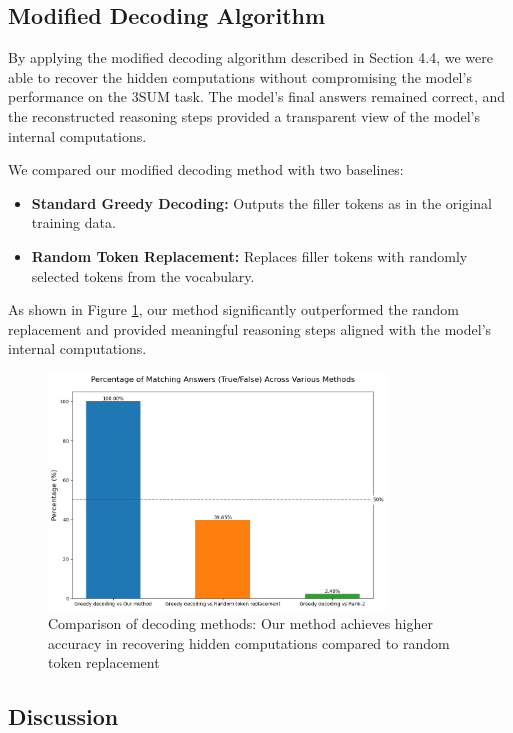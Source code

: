 \documentclass{article}
\begin{document}
\subsection{Modified Decoding Algorithm}

By applying the modified decoding algorithm described in Section 4.4, we were able to recover the hidden computations without compromising the model's performance on the 3SUM task. The model's final answers remained correct, and the reconstructed reasoning steps provided a transparent view of the model's internal computations.

We compared our modified decoding method with two baselines:

\begin{itemize}
    \item \textbf{Standard Greedy Decoding:} Outputs the filler tokens as in the original training data.
    \item \textbf{Random Token Replacement:} Replaces filler tokens with randomly selected tokens from the vocabulary.
\end{itemize}

As shown in Figure \ref{fig:token_comparison}, our method significantly outperformed the random replacement and provided meaningful reasoning steps aligned with the model's internal computations.

\begin{figure}[H]
\centering
\includegraphics[width=0.8\textwidth]{token_comparison_percentages.png}
\caption{Comparison of decoding methods: Our method achieves higher accuracy in recovering hidden computations compared to random token replacement}
\label{fig:token_comparison}
\end{figure}

\subsection{Discussion}
\end{document}
